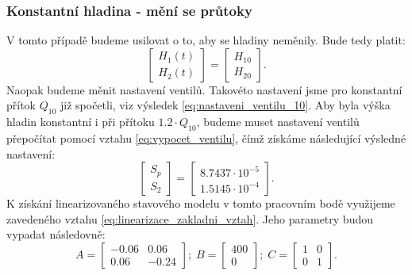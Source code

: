 \documentclass[a4paper,11pt]{article}
\begin{document}
\subsubsection{Konstantní hladina - mění se průtoky}\label{sec:2B}
V tomto případě budeme usilovat o to, aby se hladiny neměnily.
Bude tedy platit: 
\begin{equation}
\left [\begin{array}{cc}
H_{1}\left ( t \right ) \\
H_{2}\left ( t \right )
\end{array}\right ] = 
\left [\begin{array}{cc}
H_{10}\\
H_{20}\end{array}\right ].
\end{equation}
Naopak budeme měnit nastavení ventilů. Takovéto nastavení jsme pro konstantní přítok $ Q_{10} $ již spočetli, viz výsledek \ref{eq:nastaveni_ventilu_10}. Aby byla výška hladin konstantní i při přítoku $ 1.2 \cdot Q_{10} $, budeme muset nastavení ventilů přepočítat pomocí vztahu \ref{eq:vypocet_ventilu}, čímž získáme následující výsledné nastavení:
\begin{equation}\label{eq:nastaveni_ventilu_20}
\left [\begin{array}{cc}
S_{p} \\
S_{2}
\end{array}\right ] = 
\left [\begin{array}{cc}
8.7437\cdot 10^{-5}\\
1.5145\cdot 10^{-4}\end{array}\right ].
\end{equation}
K získání linearizovaného stavového modelu v tomto pracovním bodě využijeme zavedeného vztahu \ref{eq:linearizace_zakladni_vztah}. Jeho parametry budou vypadat následovně:
$$A =
\left [\begin{array}{cc}
-0.06  & 0.06 \\
0.06 & -0.24
\end{array}\right ];\;
B= 
\left [\begin{array}{cc}
400\\
0\end{array}\right ];\;
C=
\left [\begin{array}{cc}
1 & 0\\
0 & 1\end{array}\right ].
$$

\newpage 
\end{document}

